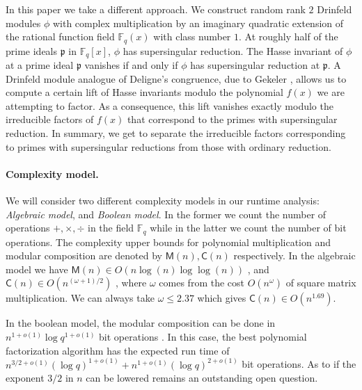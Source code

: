 \documentclass[12pt]{article}
\theoremstyle{plain}
\theoremstyle{definition}
\def\F{\ensuremath{\mathbb{F}}}
\def\MM{\ensuremath{\mathsf{M}}}
\def\CC{\ensuremath{\mathsf{C}}}
\newcommand{\p}{\mathfrak p}
\begin{document}
In this paper we take a different approach. We construct random rank $2$ Drinfeld modules $\phi$ 
with complex multiplication by an imaginary quadratic extension of the rational function field 
$\F_q(x)$  with class number $1$. At roughly half of the prime ideals $\p$ in $\F_q[x]$, $\phi$ 
has supersingular reduction. The Hasse invariant of $\phi$ at a prime ideal $\p$ vanishes if and 
only if $\phi$ has supersingular reduction at $\p$. A Drinfeld module analogue of Deligne's 
congruence, due to Gekeler \cite{gek}, allows us to compute a certain lift of Hasse invariants 
modulo the polynomial $f(x)$ we are attempting to factor. As a consequence, this lift vanishes 
exactly modulo the irreducible factors of $f(x)$ that correspond to the primes with supersingular 
reduction. In summary, we get to separate the irreducible factors corresponding to primes with 
supersingular reductions from those with ordinary reduction.

\paragraph{Complexity model.}
We will consider two different complexity models in our runtime analysis: \textit{Algebraic 
	model}, and \textit{Boolean model}. In the former we count the number of operations $+, \times, 
\div$ in the field $\F_q$ while in the latter we count the number of bit operations. The complexity 
upper bounds for polynomial multiplication and modular composition are denoted by $\MM(n), \CC(n)$ 
respectively. In the algebraic model we have $\MM(n) \in O(n\log(n)\log\log(n))$
\cite{Schonhage1971}, and $\CC(n) \in O(n^{(\omega+1)/2})$ \cite{BrKu78}, where $\omega$ comes 
from the cost $O(n^\omega)$ of square matrix multiplication. We can always take $\omega \le 2.37$ 
\cite{CoWi90} which gives $\CC(n) \in O(n^{1.69})$.

In the boolean model, the modular composition can be done in $n^{1 + o(1)}\log q^{1 + o(1)}$ bit 
operations \cite{ku}. In this case, the best polynomial factorization algorithm has the 
expected run time of $n^{3/2+o(1)} (\log q)^{1+o(1)}+n^{1+o(1)} (\log q)^{2+o(1)}$ bit operations. 
As to if the exponent $3/2$ in $n$ can be lowered remains an outstanding open question.
\end{document}
